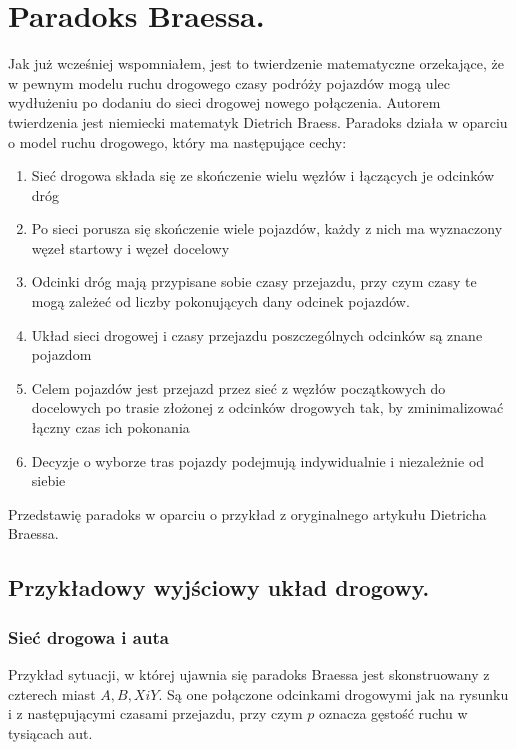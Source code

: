 \documentclass[twoside,12pt]{report}
\begin{document}
\section{Paradoks Braessa.}

Jak już wcześniej wspomniałem, jest to twierdzenie matematyczne orzekające, że w pewnym modelu ruchu drogowego czasy podróży pojazdów mogą ulec wydłużeniu po dodaniu do sieci drogowej nowego połączenia. Autorem twierdzenia jest niemiecki matematyk Dietrich Braess\cite{braess}. Paradoks działa w oparciu o model ruchu drogowego, który ma następujące cechy:

\begin{enumerate}
\item Sieć drogowa składa się ze skończenie wielu węzłów i łączących je odcinków dróg
\item Po sieci porusza się skończenie wiele pojazdów, każdy z nich ma wyznaczony węzeł startowy i węzeł docelowy
\item Odcinki dróg mają przypisane sobie czasy przejazdu, przy czym czasy te mogą zależeć od liczby pokonujących dany odcinek pojazdów.
\item Układ sieci drogowej i czasy przejazdu poszczególnych odcinków są znane pojazdom
\item Celem pojazdów jest przejazd przez sieć z węzłów początkowych do docelowych po trasie złożonej z odcinków drogowych tak, by zminimalizować łączny czas ich pokonania
\item Decyzje o wyborze tras pojazdy podejmują indywidualnie i niezależnie od siebie
\end{enumerate}
Przedstawię paradoks w oparciu o przykład z oryginalnego artykułu Dietricha Braessa.

\subsection{Przykładowy wyjściowy układ drogowy.}
\subsubsection{Sieć drogowa i auta}

Przykład sytuacji, w której ujawnia się paradoks Braessa jest skonstruowany z czterech miast $A, B, X i Y$. Są one połączone odcinkami drogowymi jak na rysunku i z następującymi czasami przejazdu, przy czym $p$ oznacza gęstość ruchu w tysiącach aut.
\end{document}
